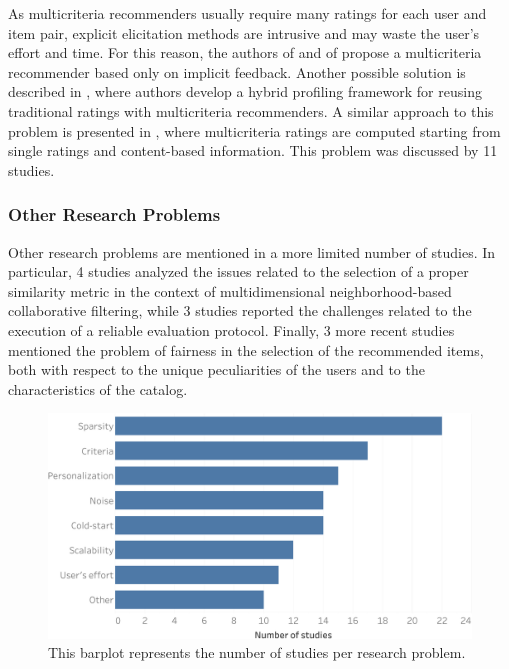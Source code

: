 As multicriteria recommenders usually require many ratings for each user and item pair, explicit elicitation methods are intrusive and may waste the user's effort and time. For this reason, the authors of  and of  propose a multicriteria recommender based only on implicit feedback. Another possible solution is described in , where  authors develop a hybrid profiling framework for reusing traditional ratings with multicriteria recommenders. A similar approach to this problem is presented in , where multicriteria ratings are computed starting from single ratings and content-based information. This problem was discussed by 11 studies.

\subsubsection{Other Research Problems}

Other research problems are mentioned in a more limited number of studies. In particular, 4 studies analyzed the issues related to the selection of a proper similarity metric in the context of multidimensional neighborhood-based collaborative filtering, while 3 studies reported the challenges related to the execution of a reliable evaluation protocol. Finally, 3 more recent studies mentioned the problem of fairness in the selection of the recommended items, both with respect to the unique peculiarities of the users and to the characteristics of the catalog.

\begin{figure}
\centering
\includegraphics[width=\textwidth]{problem_per_study}
\caption[Studies per research problem]{This barplot represents the number of studies per research problem.}
\label{mcr:fig:study-per-problem}
\end{figure}

